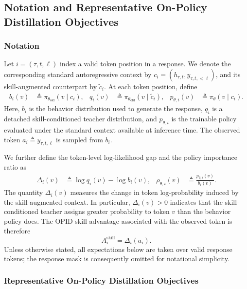 \documentclass{llmxive}
\begin{document}
\subsection{Notation and Representative On-Policy Distillation Objectives}
\label{app:theory_setup}

\subsubsection{Notation}

Let \(i=(\tau,t,\ell)\) index a valid token position in a response. We denote
the corresponding standard autoregressive context by
\(c_i=(h_{\tau,t},y_{\tau,t,<\ell})\), and its skill-augmented counterpart by
\(\widetilde c_i\). At each token position, define
\begin{equation*}
\begin{aligned}
 b_i(v) &\triangleq \pi_{\theta_{\mathrm{old}}}(v\mid c_i),
 & q_i(v) &\triangleq \pi_{\theta_{\mathrm{old}}}(v\mid \widetilde c_i),
 & p_{\theta,i}(v) &\triangleq \pi_{\theta}(v\mid c_i).
\end{aligned}
\end{equation*}
Here, \(b_i\) is the behavior distribution used to generate the response,
\(q_i\) is a detached skill-conditioned teacher distribution, and
\(p_{\theta,i}\) is the trainable policy evaluated under the standard context
available at inference time. The observed token
\(a_i\triangleq y_{\tau,t,\ell}\) is sampled from \(b_i\).

We further define the token-level log-likelihood gap and the policy importance
ratio as
\begin{equation}
\begin{aligned}
 \Delta_i(v) &\triangleq \log q_i(v)-\log b_i(v),
 & \rho_{\theta,i}(v) &\triangleq
 \frac{p_{\theta,i}(v)}{b_i(v)}.
\end{aligned}
\label{eq:gap_ratio}
\end{equation}
The quantity \(\Delta_i(v)\) measures the change in token log-probability
induced by the skill-augmented context. In particular,
\(\Delta_i(v)>0\) indicates that the skill-conditioned teacher assigns greater
probability to token \(v\) than the behavior policy does. The OPID skill
advantage associated with the observed token is therefore
\[
A_i^{\mathrm{skill}}=\Delta_i(a_i).
\]
Unless otherwise stated, all expectations below are taken over valid response
tokens; the response mask is consequently omitted for notational simplicity.

\subsubsection{Representative On-Policy Distillation Objectives}
\end{document}
